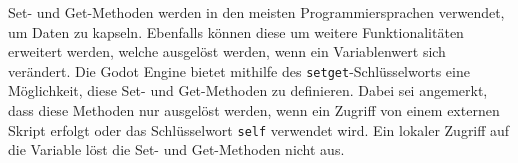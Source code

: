 
Set- und Get-Methoden werden in den meisten Programmiersprachen verwendet, um Daten zu kapseln.
Ebenfalls können diese um weitere Funktionalitäten erweitert werden, welche ausgelöst werden, wenn ein Variablenwert sich verändert.
Die Godot Engine bietet mithilfe des \texttt{setget}-Schlüsselworts eine Möglichkeit, diese Set- und Get-Methoden zu definieren.
Dabei sei angemerkt, dass diese Methoden nur ausgelöst werden, wenn ein Zugriff von einem externen Skript erfolgt oder das Schlüsselwort \texttt{self} verwendet wird.
Ein lokaler Zugriff auf die Variable löst die Set- und Get-Methoden nicht aus.
